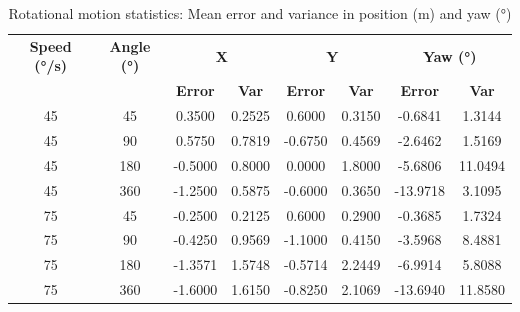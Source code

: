 \documentclass[a4paper, 12pt]{article}
\begin{document}
    \begin{table}[H]
    \centering
    \scriptsize
    \begin{tabular}{|c|c|cc|cc|cc|}
    \hline
    \textbf{Speed (°/s)} & \textbf{Angle (°)} &
    \multicolumn{2}{c|}{\textbf{X}} & \multicolumn{2}{c|}{\textbf{Y}} & \multicolumn{2}{c|}{\textbf{Yaw (°)}} \\
    \cline{3-8}
    & & \textbf{Error} & \textbf{Var} & \textbf{Error} & \textbf{Var} & \textbf{Error} & \textbf{Var} \\
    \hline
    45 & 45  &  0.3500 & 0.2525 &  0.6000 & 0.3150 & -0.6841 &  1.3144 \\
    45 & 90  &  0.5750 & 0.7819 & -0.6750 & 0.4569 & -2.6462 &  1.5169 \\
    45 & 180 & -0.5000 & 0.8000 &  0.0000 & 1.8000 & -5.6806 & 11.0494 \\
    45 & 360 & -1.2500 & 0.5875 & -0.6000 & 0.3650 & -13.9718 & 3.1095 \\
    75 & 45  & -0.2500 & 0.2125 &  0.6000 & 0.2900 & -0.3685 &  1.7324 \\
    75 & 90  & -0.4250 & 0.9569 & -1.1000 & 0.4150 & -3.5968 &  8.4881 \\
    75 & 180 & -1.3571 & 1.5748 & -0.5714 & 2.2449 & -6.9914 &  5.8088 \\
    75 & 360 & -1.6000 & 1.6150 & -0.8250 & 2.1069 & -13.6940 & 11.8580 \\
    \hline
    \end{tabular}
    \caption{Rotational motion statistics: Mean error and variance in position (m) and yaw (°)}
    \end{table}
\end{document}
